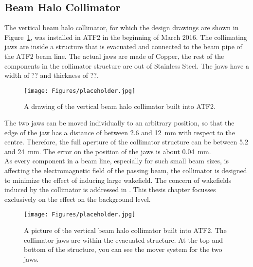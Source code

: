 \subsection{Beam Halo Collimator}
\label{Collimator}

The vertical beam halo collimator, for which the design drawings are shown in Figure~\ref{fig:collimator}, was installed in ATF2 in the beginning of March 2016. The collimating jaws are inside a structure that is evacuated and connected to the beam pipe of the ATF2 beam line. The actual jaws are made of Copper, the rest of the components in the collimator structure are out of Stainless Steel. The jaws have a width of ?? and thickness of ??.

\begin{figure}
\centering
\texttt{[image: Figures/placeholder.jpg]}%
\caption[Drawing of the beam halo collimator]{A drawing of the vertical beam halo collimator built into ATF2.\cite{NuriaCollimator2015}}
\label{fig:collimator}
\end{figure}

The two jaws can be moved individually to an arbitrary position, so that the edge of the jaw has a distance of between 2.6 and \SI{12}{\milli\metre} with respect to the centre. Therefore, the full aperture of the collimator structure can be between 5.2 and \SI{24}{\milli\metre}. The error on the position of the jaws is about \SI{0.04}{\milli\metre}.\\
As every component in a beam line, especially for such small beam sizes, is affecting the electromagnetic field of the passing beam, the collimator is designed to minimize the effect of inducing large wakefield. The concern of wakefields induced by the collimator is addressed in \cite{NuriaCollimator2015}. This thesis chapter focusses exclusively on the effect on the background level.

\begin{figure}
\centering
\texttt{[image: Figures/placeholder.jpg]}%
\caption[Picture of the installed beam halo collimator]{A picture of the vertical beam halo collimator built into ATF2. The collimator jaws are within the evacuated structure. At the top and bottom of the structure, you can see the mover system for the two jaws.}
\label{fig:installed_collimator}
\end{figure}

